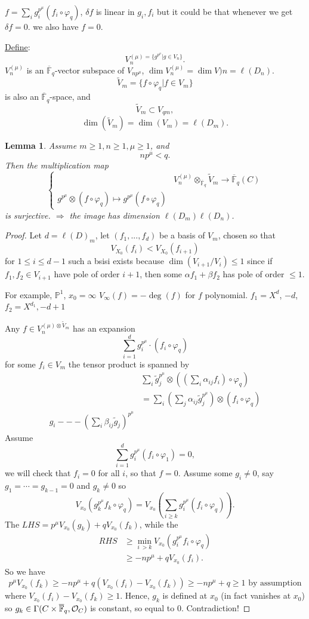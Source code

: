 \documentclass[11pt]{article}
\newtheorem{lemma}[thm]{Lemma}
\newcommand{\proj}{\mathbb P}
\newcommand{\bbf}{\mathbb F}
\newcommand{\calo}{{\cal O}}
\newcommand{\Lrta}{\Longrightarrow}
\newcommand{\lrta}{\longrightarrow}
\begin{document}
$
f=\sum_i g_i^{p^\mu}(f_i\circ \varphi_q)
$, $\delta f$ is linear in $g_i,f_i$ but it could be that  whenever we get $\delta f=0$. we also have $f=0$.

\underline{Define}:
$$
V_n^{(\mu)=\{g^{p^\mu}|g\in V_n\}}.
$$ $V_n^{(\mu)}$ is an $\overline{\bbf}_q$-vector subspace of $V_{n p^\mu}$, $\dim V_n^{(\mu)}=\dim V)n=\ell(D_n)$.
$$
\tilde{V}_m=\{f\circ \varphi_q|f\in V_m\}
$$
is also an $\overline{\bbf}_q$-space, and 
$$
\tilde{V}_m\subset V_{q m},
$$
$$
\dim (\tilde{V}_m)=\dim(V_m)=\ell(D_m).
$$

\begin{lemma}
Assume $m\geq 1, n\geq 1,\mu\geq 1$, and
$$
np^\mu< q.
$$
Then the multiplication map
$$
\left\{
\begin{aligned}
&V_n^{(\mu)}\otimes_{\overline{\bbf}_q}\tilde{V}_m\lrta \overline{\bbf}_q(C)\\
g^{p^\mu}\otimes(f\circ \varphi_q)\longmapsto g^{p^\mu}(f\circ \varphi_q)
\end{aligned}
\right.
$$
is surjective.
$\Lrta $ the image has dimension $\ell(D_m)\ell(D_n)$.
\end{lemma}
\begin{proof}
Let $d=\ell(D)_m$, let 
$(f_1,...,f_d)$ be a basis of $V_m$, chosen so that 
$$
V_{X_0}(f_i)< V_{X_0}(f_{i+1})
$$
for $1\leq i\leq d-1$ such a bsisi exists because $\dim (V_{i+1}/V_i)\leq 1$ since if $f_1,f_2\in V_{i+1}$ have pole of order $i+1$, then some $\alpha f_1+\beta f_2$ has pole of order $\leq 1$.

For example, $\proj^1$,  $x_0=\infty$ $V_\infty(f)=-\deg(f)$ for $f$ polynomial. $f_1=X^d$, $-d$, $f_2=X^{d_1}, -d+1$


Any $f \in V_n^{(\mu)\otimes \tilde{V}_m}$ has an expansion
$$
\sum_{i=1}^{d}g_i^{p^\mu}\cdot(f_i\circ \varphi_q)
$$
for some $f_i\in V_m$ the tensor product is spanned by 
$$
\begin{aligned}
&\sum_i \tilde{g}_j^{p^\mu}\otimes\left((\sum_i \alpha_{ij}f_i)\circ \varphi_q\right)\\
&= \sum_i (\sum_j \alpha_{ij}\tilde{g}_{j}^{p^\mu})\otimes (f_i\circ \varphi_q)\\
g_i---(\sum_i \beta_{ij}\tilde{g}_j)^{p^\mu}
\end{aligned}
$$
Assume 
$$
\sum_{i=1}^d g_i^{p^\mu}(f_i\circ \varphi_1)=0,
$$
we will check that $f_i=0$ for all $i$, so that $f=0$. Assume
 some $g_i\neq 0$, say $g_1=\cdots=g_{k-1}=0$ and $g_k\neq 0$
  so
  $$
V_{x_0}(g_k^{p^\mu}f_k\circ \varphi_q)
=V_{x_0}\left(\sum_{i\geq k} g_i^{p^\mu}(f_i\circ \varphi_q)\right).  $$
The $LHS=p^\mu V_{x_0}(g_k)+qV_{x_0}(f_k)$, while the
$$
\begin{aligned}
RHS&\geq \min_{i\ >k}V_{x_0}(g_i^{p^\mu}f_i\circ \varphi_q)\\
&\geq -np^\mu+qV_{x_0}(f_i).
\end{aligned}
$$ 
So we have
$$
p^\mu V_{x_0}(f_k)\geq -n p^\mu+ q(V_{x_0}(f_i)-V_{x_0}(f_k))\geq -n p^\mu+q\geq 1\text{ by assumption}
$$
where $V_{x_0}(f_i)-V_{x_0}(f_k)\geq 1$.
Hence, $g_k$ is defined at $x_0$ (in fact vanishes at $x_0$) so $g_k\in \Gamma(C\times \overline{\bbf}_q,\calo_C)$ is constant, so equal to $0$. Contradiction!
\end{proof}
\end{document}

